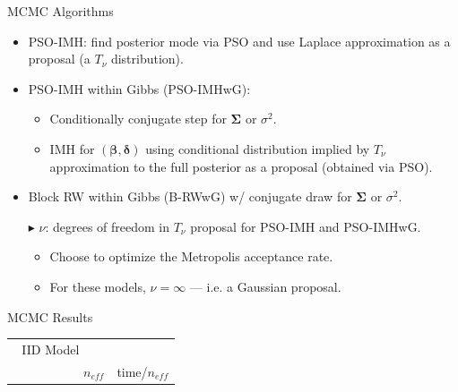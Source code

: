 \documentclass[svgnames, final]{beamer} %
\begin{document}
\begin{frame}{}
\begin{columns}[T]
    \begin{column}{0.32\textwidth}
      \vfill
      \begin{block}{\large MCMC Algorithms}
        \begin{itemize}\setlength{\itemsep0.5em}
        \item PSO-IMH: find posterior mode via PSO and use Laplace approximation as a proposal (a $T_\nu$ distribution).
        \item PSO-IMH within Gibbs (PSO-IMHwG): 
          \begin{itemize}\setlength{\itemsep0.5em}
          \item Conditionally conjugate step for $\bm{\Sigma}$ or $\sigma^2$.
          \item IMH for $(\bm{\beta}, \bm{\delta})$ using conditional distribution implied by $T_\nu$ approximation to the full posterior as a proposal (obtained via PSO).
          \end{itemize}
        \item Block RW within Gibbs (B-RWwG) w/ conjugate draw for $\bm{\Sigma}$ or $\sigma^2$.
        \end{itemize}
        \vfill
        \begin{itemize}
        \item[$\blacktriangleright$] $\nu$: degrees of freedom in $T_\nu$ proposal for PSO-IMH and PSO-IMHwG.
          \begin{itemize}\setlength{\itemsep0.5em}
          \item Choose to optimize the Metropolis acceptance rate.
          \item For these models, $\nu=\infty$ --- i.e. a Gaussian proposal.
          \end{itemize}
        \end{itemize}
      \end{block}
      \vfill
      \begin{block}{\large MCMC Results}
        \begin{table}[ht]
          \centering
          \begin{tabular}{|l|rrrr|rrrr|}
            \multicolumn{2}{c}{IID Model} & \multicolumn{7}{c}{}\\
            \multicolumn{1}{c}{} &\multicolumn{4}{c}{$n_{eff}$}&\multicolumn{4}{c}{time/$n_{eff}$}\\

\end{tabular}
\end{table}
\end{block}
\end{column}
\end{columns}
\end{frame}
\end{document}
